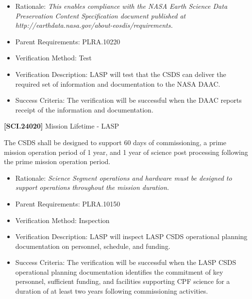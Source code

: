 \documentclass[12pt,oneside,oldfontcommands]{memoir}
\begin{document}
\begin{itemize}
\item{} Rationale: \emph{This enables compliance with the NASA Earth Science Data Preservation Content Specification document published at http:\slash \slash earthdata.nasa.gov\slash about-eosdis\slash requirements.}

\item{} Parent Requirements: PLRA.10220

\item{} Verification Method: Test

\item{} Verification Description: \gls{LASP} will \gls{test} that the \gls{CSDS} can deliver the required set of information and documentation to the NASA \gls{DAAC}.

\item{} Success Criteria: The verification will be successful when the \gls{DAAC} reports receipt of the information and documentation.

\end{itemize}

\textbf{[SCI.24020]} Mission Lifetime - \gls{LASP}

The \gls{CSDS} shall be designed to support 60 days of commissioning, a prime mission operation period of 1 year, and 1 year of science post processing following the prime mission operation period.

\begin{itemize}
\item{} Rationale: \emph{Science Segment operations and hardware must be designed to support operations throughout the mission duration.}

\item{} Parent Requirements: PLRA.10150

\item{} Verification Method: Inspection

\item{} Verification Description: \gls{LASP} will inspect \gls{LASP} \gls{CSDS} operational planning documentation on personnel, schedule, and funding.

\item{} Success Criteria: The verification will be successful when the \gls{LASP} \gls{CSDS} operational planning documentation identifies the commitment of key personnel, sufficient funding, and facilities supporting \gls{CPF} science for a duration of at least two years following commissioning activities.

\end{itemize}
\end{document}
